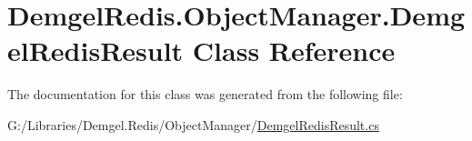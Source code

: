 \hypertarget{class_demgel_redis_1_1_object_manager_1_1_demgel_redis_result}{}\section{Demgel\+Redis.\+Object\+Manager.\+Demgel\+Redis\+Result Class Reference}
\label{class_demgel_redis_1_1_object_manager_1_1_demgel_redis_result}


The documentation for this class was generated from the following file\+:\begin{DoxyCompactItemize}
\item 
G\+:/\+Libraries/\+Demgel.\+Redis/\+Object\+Manager/\hyperlink{_demgel_redis_result_8cs}{Demgel\+Redis\+Result.\+cs}\end{DoxyCompactItemize}
